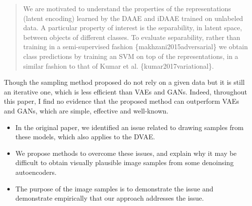 \documentclass[a4paper,11pt]{article}
\begin{document}
\begin{quote}
{\color{red} 
We are motivated to understand the properties of the representations (latent encoding) learned by the DAAE and iDAAE trained on unlabeled data. A particular property of interest is the separability, in latent space, between objects of different classes. To evaluate separability, rather than training in a semi-supervised fashion \{makhzani2015adversarial\} we obtain class predictions by training an SVM on top of the representations, in a similar fashion to that of Kumar et al. \{kumar2017variational\}. }
\end{quote}

{\color{blue}
Though the sampling method proposed do not rely on a given data but it is still an iterative one, which is less efficient than VAEs and GANs. Indeed, throughout this paper, I find no evidence that the proposed method can outperform VAEs and GANs, which are simple, effective and well-known.}\\


\begin{itemize}
    \item In the original paper, we identified an issue related to drawing samples from these models, which also applies to the DVAE.
    \item We propose methods to overcome these issues, and explain why it may be difficult to obtain visually plausible image samples from some denoinsing autoencoders.
    \item {\color{red} The purpose of the image samples is to demonstrate the issue and demonstrate empirically that our approach addresses the issue.}
\end{itemize}

% 

\end{document}
